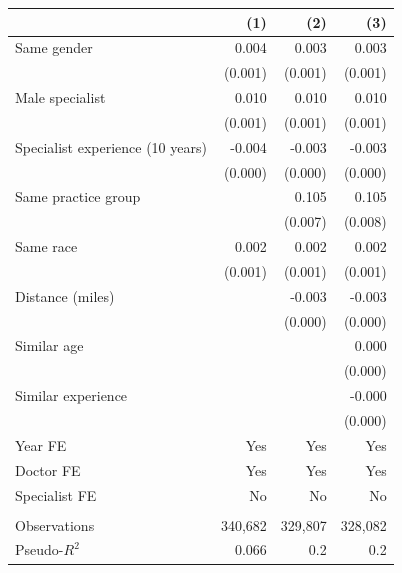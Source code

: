 
\begin{tabular}{lrrr}
\toprule
  & (1) & (2) & (3)\\
\midrule
Same gender & 0.004 & 0.003 & 0.003\\
 & (0.001) & (0.001) & \vphantom{2} (0.001)\\
Male specialist & 0.010 & 0.010 & 0.010\\
 & (0.001) & (0.001) & \vphantom{1} (0.001)\\
Specialist experience (10 years) & -0.004 & -0.003 & -0.003\\
 & (0.000) & (0.000) & (0.000)\\
Same practice group &  & 0.105 & 0.105\\
 &  & (0.007) & (0.008)\\
Same race & 0.002 & 0.002 & 0.002\\
 & (0.001) & (0.001) & (0.001)\\
Distance (miles) &  & -0.003 & -0.003\\
 &  & (0.000) & (0.000)\\
Similar age &  &  & 0.000\\
 &  &  & \vphantom{1} (0.000)\\
Similar experience &  &  & -0.000\\
 &  &  & (0.000)\\
\midrule
Year FE & Yes & Yes & Yes\\
Doctor FE & Yes & Yes & Yes\\
Specialist FE & No & No & No\\
\midrule\\
Observations & 340,682 & 329,807 & 328,082\\
Pseudo-$R^2$ & 0.066 & 0.2 & 0.2\\
\bottomrule
\end{tabular}
